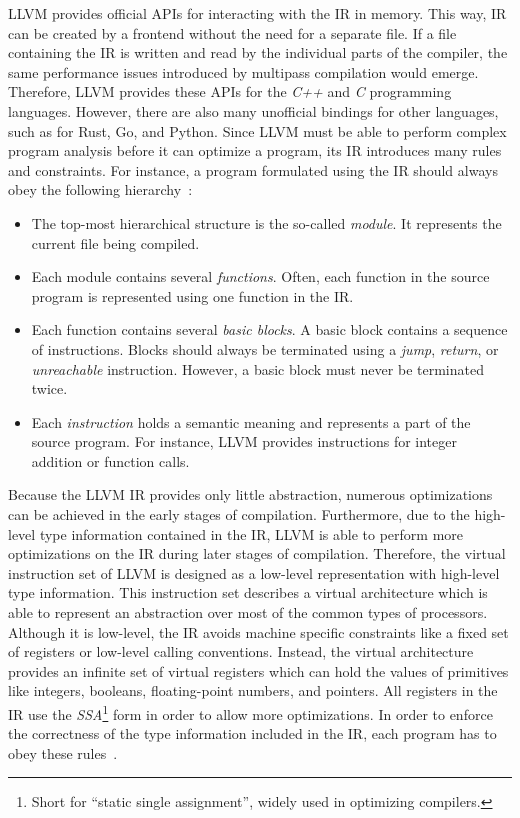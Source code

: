 LLVM provides official APIs for interacting with the IR in memory.
This way, IR can be created by a frontend without the need for a separate file\@.
If a file containing the IR is written and read by the individual parts of the compiler,
the same performance issues introduced by multipass compilation would emerge.
Therefore, LLVM provides these APIs for the \emph{C++} and \emph{C} programming languages.
However, there are also many unofficial bindings for other languages, such as for Rust, Go, and Python.
Since LLVM must be able to perform complex program analysis before it can optimize a program,
its IR introduces many rules and constraints.
For instance, a program formulated using the IR should always obey the following hierarchy~\cite[pp.~211--213]{Hsu2021-ez}:

\begin{itemize}
	\item The top-most hierarchical structure is the so-called \emph{module}.
	      It represents the current file being compiled.
	\item Each module contains several \emph{functions}.
	      Often, each function in the source program is represented using one function in the IR\@.
	\item Each function contains several \emph{basic blocks}.
	      A basic block contains a sequence of instructions.
	      Blocks should always be terminated using a \emph{jump}, \emph{return}, or \emph{unreachable} instruction.
	      However, a basic block must never be terminated twice.
	\item Each \emph{instruction} holds a semantic meaning and represents a part of the source program.
	      For instance, LLVM provides instructions for integer addition or function calls.
\end{itemize}

Because the LLVM IR provides only little abstraction, numerous optimizations can be achieved in the early stages of compilation.
Furthermore, due to the high-level type information contained in the IR, LLVM is able to perform more optimizations on the IR during later stages of compilation.
Therefore, the virtual instruction set of LLVM is designed as a low-level representation with high-level type information.
This instruction set describes a virtual architecture which is able to represent an abstraction over most of the common types of processors.
Although it is low-level, the IR avoids machine specific constraints like a fixed set of registers or low-level calling conventions.
Instead, the virtual architecture provides an infinite set of virtual registers which can hold the values of primitives like integers, booleans, floating-point numbers, and pointers.
All registers in the IR use the \emph{SSA}\footnote{Short for \enquote{static single assignment}, widely used in optimizing compilers.} form in order to allow more optimizations.
In order to enforce the correctness of the type information included in the IR, each program has to obey these rules~\cite[p.~14-17]{Lattner:MSThesis02}.


